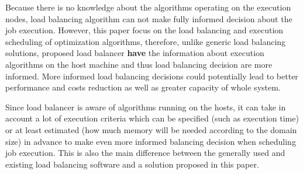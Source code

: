 Because there is no knowledge about the algorithms operating on the execution nodes,
load balancing algorithm can not make fully informed decision about the job execution.
However, this paper focus on the load balancing and execution scheduling of optimization algorithms,
therefore,
unlike generic load balancing solutions,
proposed load balancer \textbf{have} the information about execution algorithms on the host machine
and thus load balancing decision are more informed.
More informed load balancing decisions could potentially lead to better performance and costs reduction as well as greater capacity of whole system.

Since load balancer is aware of algorithms running on the hosts,
it can take in account a lot of execution criteria which can be specified (such as execution time)
or at least estimated (how much memory will be needed according to the domain size) in advance to make even more informed balancing decision
when scheduling job execution.
This is also the main difference between the generally used and existing load balancing software and a solution proposed in this paper.






















